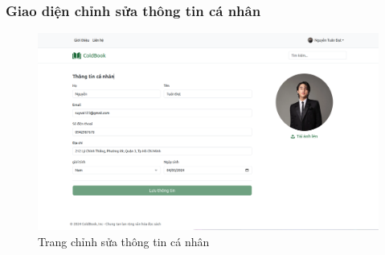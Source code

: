\subsubsection{Giao diện chỉnh sửa thông tin cá nhân}
\begin{figure}[H]
  \centering
  \includegraphics[width=1\textwidth]{report/images/client/c_thongtincanhan.png}
  \caption{Trang chỉnh sửa thông tin cá nhân}
\end{figure}